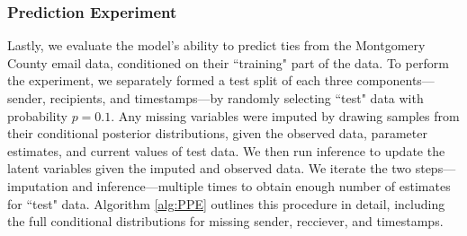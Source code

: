 \documentclass[12pt]{article}
\begin{document}
	\subsubsection{Prediction Experiment}\label{subsubsec:Experiment_email}
Lastly, we evaluate the model's ability to predict ties from the Montgomery County email data, conditioned on their ``training" part of the data. To perform the experiment, we separately formed a test split of each three components---sender, recipients, and timestamps---by randomly selecting ``test" data with probability $p=0.1$. Any missing variables were imputed by drawing samples from their conditional posterior distributions, given the observed data, parameter estimates, and current values of test data. We then run inference to update the latent variables given the imputed and observed data. We iterate the two steps---imputation and inference---multiple times to obtain enough number of estimates for ``test" data. Algorithm \ref{alg:PPE} outlines this procedure in detail, including the full conditional distributions for missing sender, recciever, and timestamps.	
\end{document}
